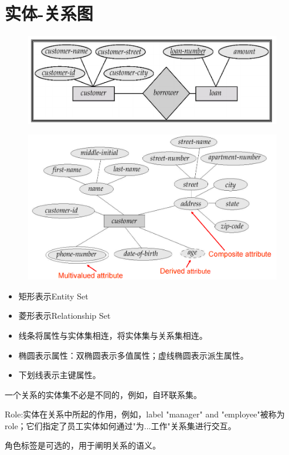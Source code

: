 \section{实体-关系图}

\begin{figure}[H]
    \centering
    \includegraphics[width=0.8\linewidth]{image1.png}
    \caption{}
    \label{}
\end{figure}

\begin{figure}[H]
    \centering
    \includegraphics[width=0.8\linewidth]{image2.png}
    \caption{}
    \label{}
\end{figure}

\begin{itemize}
    \item 矩形表示Entity Set
    \item 菱形表示Relationship Set
    \item 线条将属性与实体集相连，将实体集与关系集相连。
    \item 椭圆表示属性：双椭圆表示多值属性；虚线椭圆表示派生属性。
    \item 下划线表示主键属性。
\end{itemize}

一个关系的实体集不必是不同的，例如，自环联系集。

Role:实体在关系中所起的作用，例如，label "manager" and "employee"被称为role；它们指定了员工实体如何通过"为...工作"关系集进行交互。

角色标签是可选的，用于阐明关系的语义。


